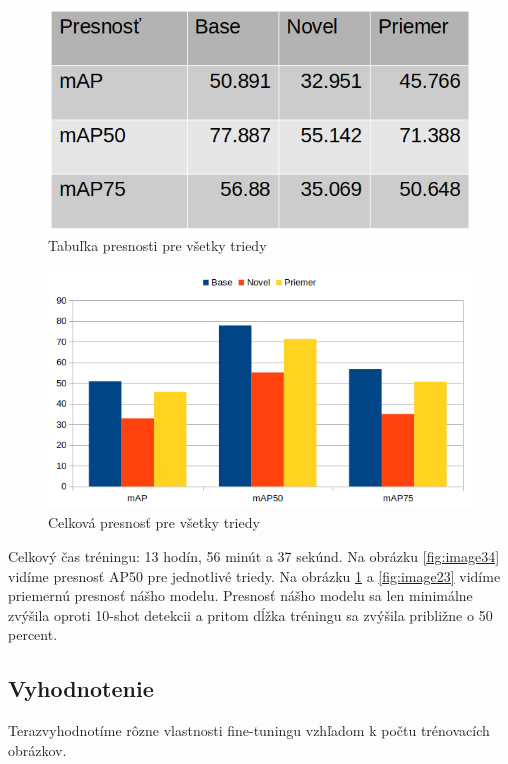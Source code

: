 \begin{figure}[H]
\includegraphics[width=\textwidth]{images/15shot_table_meanAP.png}
\centering
\caption{Tabuľka presnosti pre všetky triedy}
\label{fig:image35}
\end{figure}

\begin{figure}[H]
\includegraphics[width=\textwidth]{images/15_shot_meanAP.png}
\centering
\caption{Celková presnosť pre všetky triedy}
\label{fig:image36}
\end{figure}

Celkový čas tréningu: 13 hodín, 56 minút a 37 sekúnd. Na obrázku \ref{fig:image34} vidíme presnosť AP50 pre jednotlivé triedy. Na obrázku \ref{fig:image35} a \ref{fig:image23} vidíme priemernú presnosť nášho modelu. Presnosť nášho modelu sa len minimálne zvýšila oproti 10-shot detekcii a pritom dĺžka tréningu sa zvýšila približne o 50 percent.

\subsection{Vyhodnotenie}

Terazvyhodnotíme rôzne vlastnosti fine-tuningu vzhľadom k počtu trénovacích obrázkov. 

